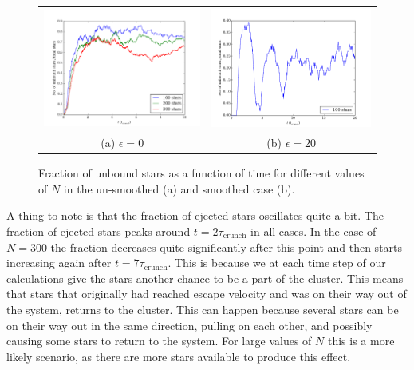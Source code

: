 \documentclass{article}
\begin{document}
\begin{multicols}{2}
\begin{figure}
\begin{center}
\begin{tabular}{cc}
  	\includegraphics[width=90mm]{Images/unbound_stars.png}
	& \includegraphics[width=90mm]{Images/unbound_epsilon20.png} \\
	(a) $\epsilon = 0$		& (b) $\epsilon = 20$  \\[6pt]
\end{tabular}
\caption{Fraction of unbound stars as a function of time for different values of $N$ in the un-smoothed (a) and smoothed case (b).}\label{fig:Nbody_unbound}
\end{center}
\end{figure}
A thing to note is that the fraction of ejected stars oscillates quite a bit. The fraction of ejected stars peaks around $t = 2\tau_{\mathrm{crunch}}$ in all cases. In the case of $N = 300$ the fraction decreases quite significantly after this point and then starts increasing again after $t = 7\tau_{\mathrm{crunch}}$. This is because we at each time step of our calculations give the stars another chance to be a part of the cluster. This means that stars that originally had reached escape velocity and was on their way out of the system, returns to the cluster. This can happen because several stars can be on their way out in the same direction, pulling on each other, and possibly causing some stars to return to the system. For large values of $N$ this is a more likely scenario, as there are more stars available to produce this effect.





\end{multicols}
\end{document}
